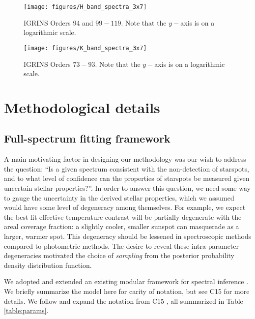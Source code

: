 \documentclass[onecolumn]{emulateapj}%
\newcommand{\iancze}{{\sc C15 }}
\begin{document}
\begin{figure*}
	\centering
	\texttt{[image: figures/H\_band\_spectra\_3x7]}
	\caption{IGRINS Orders 94 and $99-119$.  Note that the $y-$axis is on a logarithmic scale.  }
	\label{fig:Hband3x7}
\end{figure*}

\begin{figure*}
	\centering
	\texttt{[image: figures/K\_band\_spectra\_3x7]}
	\caption{IGRINS Orders $73-93$.  Note that the $y-$axis is on a logarithmic scale.  }
	\label{fig:Kband3x7}
\end{figure*}


\section{Methodological details}
\label{methods-details}

\subsection{Full-spectrum fitting framework}


A main motivating factor in designing our methodology was our wish to address the question: ``Is a given spectrum consistent with the non-detection of starspots, and to what level of confidence can the properties of starspots be measured given uncertain stellar properties?''.  In order to answer this question, we need some way to gauge the uncertainty in the derived stellar properties, which we assumed would have some level of degeneracy among themselves.  For example, we expect the best fit effective temperature contrast will be partially degenerate with the areal coverage fraction: a slightly cooler, smaller sunspot can masquerade as a larger, warmer spot.  This degeneracy should be lessened in spectroscopic methods compared to photometric methods.  The desire to reveal these intra-parameter degeneracies motivated the choice of \emph{sampling} from the posterior probability density distribution function.


We adopted and extended an existing modular framework for spectral inference \citep[][hereafter \iancze]{2015ApJ...812..128C}.  We briefly summarize the model here for carity of notation, but see \iancze for more details.  We follow and expand the notation from \iancze, all summarized in Table \ref{table:params}. 
\end{document}
